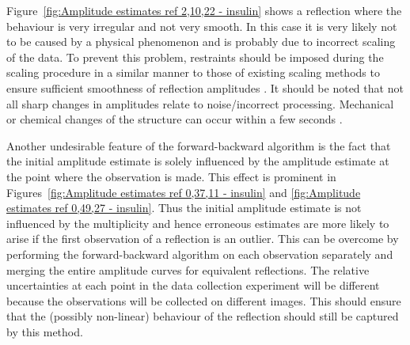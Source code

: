 Figure~\ref{fig:Amplitude estimates ref 2,10,22 - insulin} shows a reflection where the behaviour is very irregular and not very smooth.
In this case it is very likely not to be caused by a physical phenomenon and is probably due to incorrect scaling of the data.
To prevent this problem, restraints should be imposed during the scaling procedure in a similar manner to those of existing scaling methods to ensure sufficient smoothness of reflection amplitudes \cite{evans2013,kabsch2010integration}.
It should be noted that not all sharp changes in amplitudes relate to noise/incorrect processing.
Mechanical or chemical changes of the structure can occur within a few seconds \cite{allan2012}.

Another undesirable feature of the forward-backward algorithm is the fact that the initial amplitude estimate is solely influenced by the amplitude estimate at the point where the observation is made.
This effect is prominent in Figures~\ref{fig:Amplitude estimates ref 0,37,11 - insulin} and \ref{fig:Amplitude estimates ref 0,49,27 - insulin}.
Thus the initial amplitude estimate is not influenced by the multiplicity and hence erroneous estimates are more likely to arise if the first observation of a reflection is an outlier.
This can be overcome by performing the forward-backward algorithm on each observation separately and merging the entire amplitude curves for equivalent reflections.
The relative uncertainties at each point in the data collection experiment will be different because the observations will be collected on different images.
This should ensure that the (possibly non-linear) behaviour of the reflection should still be captured by this method.
